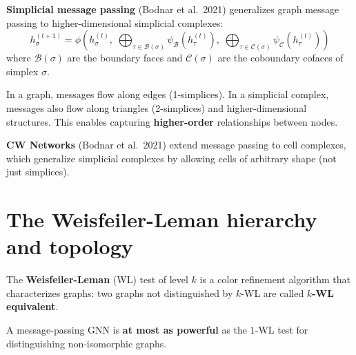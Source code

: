 \begin{definition}
\textbf{Simplicial message passing} (Bodnar et al.\ 2021)
generalizes graph message passing to higher-dimensional simplicial
complexes:
\[
  h_\sigma^{(t+1)} = \phi\!\left(h_\sigma^{(t)},\;
  \bigoplus_{\tau \in \mathcal{B}(\sigma)}
    \psi_{\mathcal{B}}(h_\tau^{(t)}),\;
  \bigoplus_{\tau \in \mathcal{C}(\sigma)}
    \psi_{\mathcal{C}}(h_\tau^{(t)})
  \right)
\]
where $\mathcal{B}(\sigma)$ are the boundary faces and
$\mathcal{C}(\sigma)$ are the coboundary cofaces of simplex $\sigma$.
\end{definition}

\begin{intuition}
In a graph, messages flow along edges (1-simplices). In a simplicial
complex, messages also flow along triangles (2-simplices) and
higher-dimensional structures. This enables capturing
\textbf{higher-order} relationships between nodes.
\end{intuition}

\begin{definition}
\textbf{CW Networks} (Bodnar et al.\ 2021) extend message passing
to cell complexes, which generalize simplicial complexes by allowing
cells of arbitrary shape (not just simplices).
\end{definition}

\section{The Weisfeiler-Leman hierarchy and topology}
\label{sec:wl_topology}

\begin{definition}
The \textbf{Weisfeiler-Leman} (WL) test of level $k$ is a
color refinement algorithm that characterizes graphs: two graphs
not distinguished by $k$-WL are called \textbf{$k$-WL equivalent}.
\end{definition}

\begin{theorem}
A message-passing GNN is \textbf{at most as powerful} as the
$1$-WL test for distinguishing non-isomorphic graphs.
\end{theorem}

